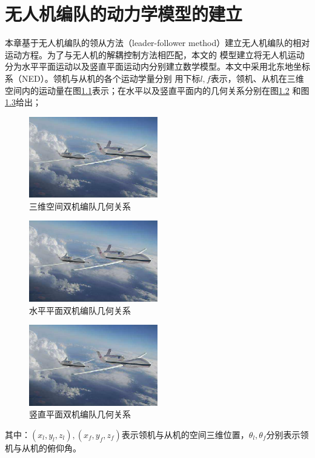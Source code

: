\chapter{无人机编队的动力学模型的建立}
\label{chap:formation_dynamic_equ}
本章基于无人机编队的领从方法（leader-follower method）建立无人机编队的相对运动方程。为了与无人机的解耦控制方法相匹配，本文的
模型建立将无人机运动分为水平平面运动以及竖直平面运动内分别建立数学模型。本文中采用北东地坐标系（NED）。领机与从机的各个运动学量分别
用下标$l,f$表示，领机、从机在三维空间内的运动量在图\ref{fig:c02-3d_rel_motion}表示；在水平以及竖直平面内的几何关系分别在图\ref{fig:c02-2d_level_motion}
和图\ref{fig:c02-2d_vert_motion}给出；
\begin{figure}[H]
    \centering
    \includegraphics[width=0.5\textwidth]{figures/c01-meaning-1}
    \caption{三维空间双机编队几何关系}\label{fig:c02-3d_rel_motion}
\end{figure}
\begin{figure}[H]
    \centering
    \includegraphics[width=0.5\textwidth]{figures/c01-meaning-1}
    \caption{水平平面双机编队几何关系}\label{fig:c02-2d_level_motion}
\end{figure}
\begin{figure}[H]
    \centering
    \includegraphics[width=0.5\textwidth]{figures/c01-meaning-1}
    \caption{竖直平面双机编队几何关系}\label{fig:c02-2d_vert_motion}
\end{figure}
其中：$(x_l,y_l,z_l),(x_f,y_f,z_f)$表示领机与从机的空间三维位置，$\theta_l,\theta_f$分别表示领机与从机的俯仰角。